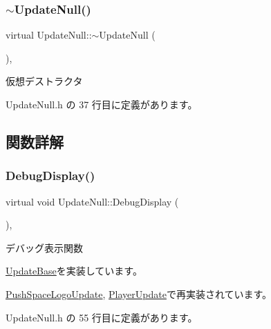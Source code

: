 \subsubsection{\texorpdfstring{$\sim$\+Update\+Null()}{~UpdateNull()}}
{\footnotesize\ttfamily virtual Update\+Null\+::$\sim$\+Update\+Null (\begin{DoxyParamCaption}{ }\end{DoxyParamCaption})\hspace{0.3cm}{\ttfamily [inline]}, {\ttfamily [virtual]}}



仮想デストラクタ 



 Update\+Null.\+h の 37 行目に定義があります。



\subsection{関数詳解}
\mbox{\label{class_update_null_a77aee1e614cf6dafe4f9af58b2205e4b}} 
\subsubsection{\texorpdfstring{Debug\+Display()}{DebugDisplay()}}
{\footnotesize\ttfamily virtual void Update\+Null\+::\+Debug\+Display (\begin{DoxyParamCaption}{ }\end{DoxyParamCaption})\hspace{0.3cm}{\ttfamily [inline]}, {\ttfamily [virtual]}}



デバッグ表示関数 



\mbox{\hyperlink{class_update_base_a5c63c3c3ef1b85f3701718ec3f7b39e2}{Update\+Base}}を実装しています。



\mbox{\hyperlink{class_push_space_logo_update_ab18a0c905455da17f9e2f1fe5f0c34e6}{Push\+Space\+Logo\+Update}}, \mbox{\hyperlink{class_player_update_ac15fd0faf356c6e66f6c62c2b6b8d3ac}{Player\+Update}}で再実装されています。



 Update\+Null.\+h の 55 行目に定義があります。

\mbox{\label{class_update_null_ac68da1ba7f3fbcae833442bb1c169200}} 
